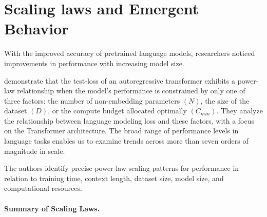 \section{Scaling laws and Emergent Behavior}
\label{sec:scaling_laws}


With the improved accuracy of pretrained language models, researchers noticed improvements in performance with increasing model size. 

\citet{kaplan2020scaling} demonstrate that the test-loss of an autoregressive transformer exhibits a power-law relationship when the model's performance is constrained by only one of three factors: the number of non-embedding parameters $(N)$, the size of the dataset $(D)$, or the compute budget allocated optimally $(C_{min})$.
They analyze the relationship between language modeling loss and these factors, with a focus on the Transformer architecture. The broad range of performance levels in language tasks enables us to examine trends across more than seven orders of magnitude in scale.

The authors identify precise power-law scaling patterns for performance in relation to training time, context length, dataset size, model size, and computational resources.



\paragraph{Summary of Scaling Laws.}

